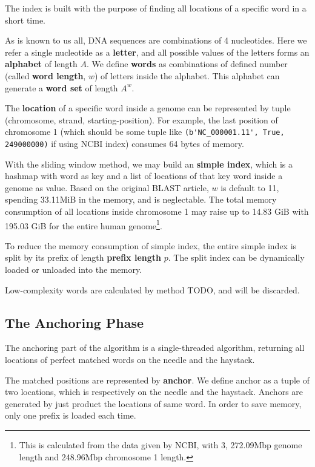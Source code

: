 \documentclass[10pt,final,journal,twocolumn,a4paper]{IEEEtran}
\begin{document}
The index is built with the purpose of finding all locations of a specific word in a short time.

As is known to us all, DNA sequences are combinations of 4 nucleotides. Here we refer a single nucleotide as a \textbf{letter}, and all possible values of the letters forms an \textbf{alphabet} of length $A$. We define \textbf{words} as combinations of defined number (called \textbf{word length}, $w$) of letters inside the alphabet. This alphabet can generate a \textbf{word set} of length $A^{w}$.

The \textbf{location} of a specific word inside a genome can be represented by tuple (chromosome, strand, starting-position). For example, the last position of chromosome 1 (which should be some tuple like \verb|(b'NC_000001.11', True, 249000000)| if using NCBI index) consumes 64 bytes of memory.

With the sliding window method, we may build an \textbf{simple index}, which is a hashmap with word as key and a list of locations of that key word inside a genome as value. Based on the original BLAST article, $w$ is default to 11, spending 33.11MiB in the memory, and is neglectable. The total memory consumption of all locations inside chromosome 1 may raise up to 14.83 GiB with 195.03 GiB for the entire human genome\footnote{This is calculated from the data given by NCBI, with 3, 272.09Mbp genome length and 248.96Mbp chromosome 1 length.}.

To reduce the memory consumption of simple index, the entire simple index is split by its prefix of length \textbf{prefix length} $p$. The split index can be dynamically loaded or unloaded into the memory.

Low-complexity words are calculated by method TODO, and will be discarded.

\subsection{The \textbf{Anchoring} Phase}

The anchoring part of the algorithm is a single-threaded algorithm, returning all locations of perfect matched words on the needle and the haystack.

The matched positions are represented by \textbf{anchor}. We define anchor as a tuple of two locations, which is respectively on the needle and the haystack. Anchors are generated by just product the locations of same word. In order to save memory, only one prefix is loaded each time.
\end{document}
